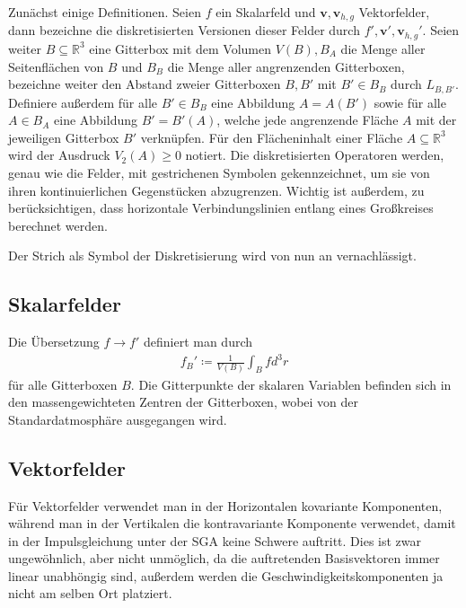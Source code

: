 \documentclass{book}
\begin{document}
Zunächst einige Definitionen. Seien $f$ ein Skalarfeld und $\mathbf{v}, \mathbf{v}_{h, g}$ Vektorfelder, dann bezeichne die diskretisierten Versionen dieser Felder durch $f', \mathbf{v}', \mathbf{v}_{h, g}'$. Seien weiter $B\subseteq\mathbb{R}^3$ eine Gitterbox mit dem Volumen $V\left(B\right), B_A$ die Menge aller Seitenflächen von $B$ und $B_B$ die Menge aller angrenzenden Gitterboxen, bezeichne weiter den Abstand zweier Gitterboxen $B, B'$ mit $B'\in B_B$ durch $L_{B, B'}$. Definiere außerdem für alle $B'\in B_B$ eine Abbildung $A = A\left(B'\right)$ sowie für alle $A\in B_A$ eine Abbildung $B' = B'\left(A\right)$, welche jede angrenzende Fläche $A$ mit der jeweiligen Gitterbox $B'$ verknüpfen. Für den Flächeninhalt einer Fläche $A\subseteq\mathbb{R}^3$ wird der Ausdruck $V_2\left(A\right)\geq 0$ notiert. Die diskretisierten Operatoren werden, genau wie die Felder, mit gestrichenen Symbolen gekennzeichnet, um sie von ihren kontinuierlichen Gegenstücken abzugrenzen. Wichtig ist außerdem, zu berücksichtigen, dass horizontale Verbindungslinien entlang eines Großkreises berechnet werden.

Der Strich als Symbol der Diskretisierung wird von nun an vernachlässigt.

\subsection{Skalarfelder}
\label{sec:skalarfelder}

Die Übersetzung $f\to f'$ definiert man durch
%
\begin{eqnarray}
f_B' \coloneqq\frac{1}{V\left(B\right)}\int_Bfd^3r
\end{eqnarray}
%
für alle Gitterboxen $B$. Die Gitterpunkte der skalaren Variablen befinden sich in den massengewichteten Zentren der Gitterboxen, wobei von der Standardatmosphäre ausgegangen wird.

\subsection{Vektorfelder}
\label{sec:vektorfelder}

Für Vektorfelder verwendet man in der Horizontalen kovariante Komponenten, während man in der Vertikalen die kontravariante Komponente verwendet, damit in der Impulsgleichung unter der SGA keine Schwere auftritt. Dies ist zwar ungewöhnlich, aber nicht unmöglich, da die auftretenden Basisvektoren immer linear unabhöngig sind, außerdem werden die Geschwindigkeitskomponenten ja nicht am selben Ort platziert.
\end{document}
